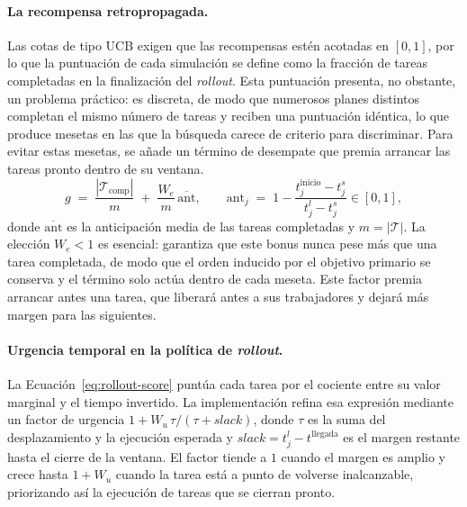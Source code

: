 \paragraph{La recompensa retropropagada.} Las cotas de tipo UCB exigen que las recompensas estén acotadas en $[0,1]$, por lo que la puntuación de cada simulación se define como la fracción de tareas completadas en la finalización del \textit{rollout}. Esta puntuación presenta, no obstante, un problema práctico: es discreta, de modo que numerosos planes distintos completan el mismo número de tareas y reciben una puntuación idéntica, lo que produce mesetas en las que la búsqueda carece de criterio para discriminar. Para evitar estas mesetas, se añade un término de desempate que premia arrancar las tareas pronto dentro de su ventana.
\begin{equation} \label{eq:reward-rollout-impl}
    g \;=\; \frac{|\mathcal{T}_{\mathrm{comp}}|}{m} \;+\; \frac{W_e}{m}\,\overline{\mathrm{ant}},
    \qquad
    \mathrm{ant}_j \;=\; 1-\frac{t_j^{\mathrm{inicio}} - t_j^{s}}{t_j^{l}-t_j^{s}} \in [0,1],
\end{equation}
donde $\overline{\mathrm{ant}}$ es la anticipación media de las tareas completadas y $m=|\mathcal{T}|$. La elección $W_e<1$ es esencial: garantiza que este bonus nunca pese más que una tarea completada, de modo que el orden inducido por el objetivo primario se conserva y el término solo actúa dentro de cada meseta. Este factor premia arrancar antes una tarea, que liberará antes a sus trabajadores y dejará más margen para las siguientes.

\paragraph{Urgencia temporal en la política de \textit{rollout}.} La Ecuación~\eqref{eq:rollout-score} puntúa cada tarea por el cociente entre su valor marginal y el tiempo invertido. La implementación refina esa expresión mediante un factor de urgencia $1+W_u\,\tau/(\tau+\textit{slack})$, donde $\tau$ es la suma del desplazamiento y la ejecución esperada y $\textit{slack}=t_j^{l}-t^{\mathrm{llegada}}$ es el margen restante hasta el cierre de la ventana. El factor tiende a $1$ cuando el margen es amplio y crece hasta $1+W_u$ cuando la tarea está a punto de volverse inalcanzable, priorizando así la ejecución de tareas que se cierran pronto.

